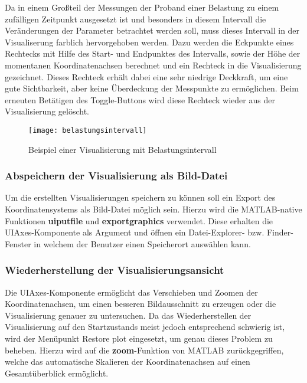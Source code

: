 Da in einem Großteil der Messungen der Proband einer Belastung zu einem zufälligen Zeitpunkt ausgesetzt ist und besonders in diesem Intervall die Veränderungen der Parameter betrachtet werden soll, muss dieses Intervall in der Visualiserung farblich hervorgehoben werden. Dazu werden die Eckpunkte eines Rechtecks mit Hilfe des Start- und Endpunktes des Intervalls, sowie der Höhe der momentanen Koordinatenachsen berechnet und ein Rechteck in die Visualisierung gezeichnet. Dieses Rechteck erhält dabei eine sehr niedrige Deckkraft, um eine gute Sichtbarkeit, aber keine Überdeckung der Messpunkte zu ermöglichen. Beim erneuten Betätigen des Toggle-Buttons wird diese Rechteck wieder aus der Visualisierung gelöscht.



\begin{figure}[H]
	\centering
	\texttt{[image: belastungsintervall]}
	\caption{Beispiel einer Visualisierung mit Belastungsintervall}
	\label{fig:belastungsintervall}
\end{figure}

\subsubsection{Abspeichern der Visualisierung als Bild-Datei}

Um die erstellten Visualisierungen speichern zu können soll ein Export des Koordinatensystems als Bild-Datei möglich sein. Hierzu wird die MATLAB-native Funktionen \textbf{uiputfile} und \textbf{exportgraphics} verwendet. Diese erhalten die UIAxes-Komponente als Argument und öffnen ein Datei-Explorer- bzw. Finder-Fenster in welchem der Benutzer einen Speicherort auswählen kann.



\subsubsection{Wiederherstellung der Visualisierungsansicht}

Die UIAxes-Komponente ermöglicht das Verschieben und Zoomen der Koordinatenachsen, um einen besseren Bildausschnitt zu erzeugen oder die Visualisierung genauer zu untersuchen. Da das Wiederherstellen der Visualisierung auf den Startzustands meist jedoch entsprechend schwierig ist, wird der Menüpunkt \glqq Restore plot\grqq{} eingesetzt, um genau dieses Problem zu beheben. Hierzu wird auf die \textbf{zoom}-Funktion von MATLAB zurückgegriffen, welche das automatische Skalieren der Koordinatenachsen auf einen Gesamtüberblick ermöglicht.


